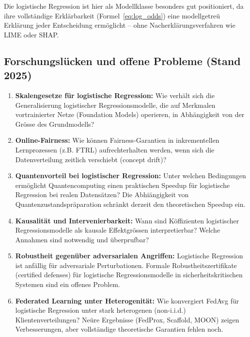 ﻿\documentclass[12pt, a4paper]{article}
\theoremstyle{definition}
\theoremstyle{remark}
\begin{document}
Die logistische Regression ist hier als Modellklasse besonders gut positioniert, da ihre
vollständige Erklärbarkeit (Formel~\eqref{eq:log_odds}) eine modellgetreü Erklärung
jeder Entscheidung ermöglicht -- ohne Nacherklärungsverfahren wie LIME oder SHAP.

\subsection{Forschungslücken und offene Probleme (Stand 2025)}

\begin{enumerate}[label=\textbf{F\arabic*.}]
  \item \textbf{Skalengesetze für logistische Regression:} Wie verhält sich die
    Generalisierung logistischer Regressionsmodelle, die auf Merkmalen vortrainierter
    Netze (Foundation Models) operieren, in Abhängigkeit von der Grösse des Grundmodells?

  \item \textbf{Online-Fairness:} Wie können Fairness-Garantien in inkrementellen
    Lernprozessen (z.B. FTRL) aufrechterhalten werden, wenn sich die Datenverteilung zeitlich
    verschiebt (concept drift)?

  \item \textbf{Quantenvorteil bei logistischer Regression:} Unter welchen Bedingungen
    ermöglicht Quantencomputing einen praktischen Speedup für logistische Regression bei
    realen Datensätzen? Die Abhiängigkeit von Quantenzustandspräparation schränkt
    derzeit den theoretischen Speedup ein.

  \item \textbf{Kausalität und Intervenierbarkeit:} Wann sind Köffizienten logistischer
    Regressionsmodelle als kausale Effektgrössen interpretierbar? Welche Annahmen sind
    notwendig und überprufbar?

  \item \textbf{Robustheit gegenüber adversarialen Angriffen:} Logistische Regression ist
    anfällig für adversariale Perturbationen. Formale Robustheitszertifikate (certified
    defenses) für logistische Regressionsmodelle in sicherheitskritischen Systemen sind
    ein offenes Problem.

  \item \textbf{Federated Learning unter Heterogenität:} Wie konvergiert FedAvg für
    logistische Regression unter stark heterogenen (non-i.i.d.) Klientenverteilungen?
    Neüre Ergebnisse (FedProx, Scaffold, MOON) zeigen Verbesserungen, aber vollständige
    theoretische Garantien fehlen noch.
\end{enumerate}
\end{document}
